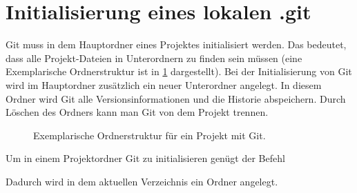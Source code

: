 \section{Initialisierung eines lokalen .git}
Git muss in dem Hauptordner eines Projektes initialisiert werden. Das bedeutet, dass alle Projekt-Dateien in Unterordnern zu finden sein müssen (eine Exemplarische Ordnerstruktur ist in \ref{fig:dir_struc} dargestellt). Bei der Initialisierung von Git wird im Hauptordner zusätzlich ein neuer Unterordner   angelegt. In diesem Ordner wird Git alle Versionsinformationen und die Historie abspeichern. Durch Löschen des Ordners kann man Git von dem Projekt trennen.
\begin{figure}[!h]
    \caption{Exemplarische Ordnerstruktur für ein Projekt mit Git.}
    \label{fig:dir_struc}
\end{figure}

Um in einem Projektordner Git zu initialisieren genügt der Befehl 
Dadurch wird in dem aktuellen Verzeichnis ein  Ordner angelegt.
%
